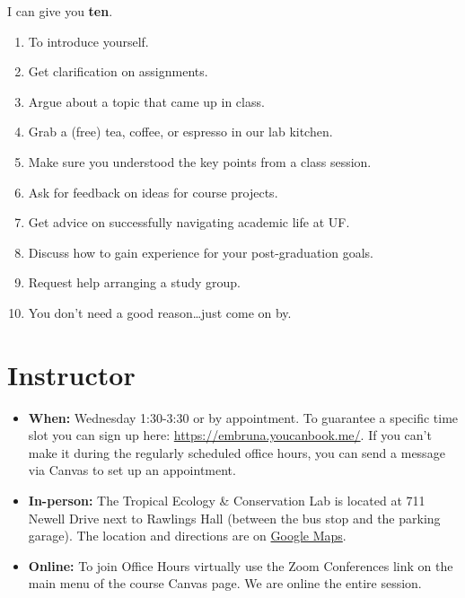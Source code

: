 \documentclass[
  12pt,
  letterpaper,
  DIV=11,
  numbers=noendperiod]{scrreprt}
\providecommand{\tightlist}{%
  \setlength{\itemsep}{0pt}\setlength{\parskip}{0pt}}
\begin{document}
\begin{tcolorbox}[enhanced jigsaw, arc=.35mm, bottomrule=.15mm, bottomtitle=1mm, breakable, colback=white, colbacktitle=quarto-callout-tip-color!10!white, colframe=quarto-callout-tip-color-frame, coltitle=black, left=2mm, leftrule=.75mm, opacityback=0, opacitybacktitle=0.6, rightrule=.15mm, title=\textcolor{quarto-callout-tip-color}{\faLightbulb}\hspace{0.5em}{Can you give me \textbf{one good reason} why I should go to Office
Hours?}, titlerule=0mm, toprule=.15mm, toptitle=1mm]

I can give you \textbf{ten}.

\begin{enumerate}
\def\labelenumi{\arabic{enumi}.}
\tightlist
\item
  To introduce yourself.
\item
  Get clarification on assignments.
\item
  Argue about a topic that came up in class.
\item
  Grab a (free) tea, coffee, or espresso in our lab kitchen.
\item
  Make sure you understood the key points from a class session.
\item
  Ask for feedback on ideas for course projects.
\item
  Get advice on successfully navigating academic life at UF.
\item
  Discuss how to gain experience for your post-graduation goals.
\item
  Request help arranging a study group.
\item
  You don't need a good reason\ldots just come on by.
\end{enumerate}

\end{tcolorbox}

\section*{Instructor}\label{instructor}

\begin{itemize}
\item
  \textbf{When:} Wednesday 1:30-3:30 or by appointment. To guarantee a
  specific time slot you can sign up here:
  \url{https://embruna.youcanbook.me/}. If you can't make it during the
  regularly scheduled office hours, you can send a message via Canvas to
  set up an appointment.
\item
  \textbf{In-person:} The Tropical Ecology \& Conservation Lab is
  located at 711 Newell Drive next to Rawlings Hall (between the bus
  stop and the parking garage). The location and directions are on
  \href{https://maps.app.goo.gl/xo13vJmj8WXAivpZ9}{Google Maps}.
\item
  \textbf{Online:} To join Office Hours virtually use the Zoom
  Conferences link on the main menu of the course Canvas page. We are
  online the entire session.
\end{itemize}
\end{document}
